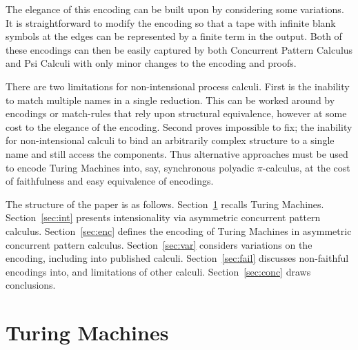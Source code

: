 \documentclass[submission,copyright,creativecommons]{eptcs}
\begin{document}
The elegance of this encoding can be built upon by considering some variations.
It is straightforward to modify the encoding so that a tape with infinite blank symbols
at the edges can be represented by a finite term in the output.
Both of these encodings can then be easily captured by both Concurrent Pattern Calculus
and Psi Calculi with only minor changes to the encoding and proofs.

There are two limitations for non-intensional process calculi.
First is the inability to match multiple names in a single reduction.
This can be worked around by encodings or match-rules that rely upon structural equivalence,
however at some cost to the elegance of the encoding.
Second proves impossible to fix; the inability for non-intensional calculi to bind
an arbitrarily complex structure to a single name and still access the components.
Thus alternative approaches must be used to encode Turing Machines into, say,
synchronous polyadic $\pi$-calculus, at the cost of faithfulness and easy equivalence
of encodings.


\medskip

The structure of the paper is as follows.
Section~\ref{sec:tm} recalls Turing Machines.
Section~\ref{sec:int} presents intensionality via asymmetric concurrent pattern calculus.
Section~\ref{sec:enc} defines the encoding of Turing Machines in asymmetric concurrent pattern calculus.
Section~\ref{sec:var} considers variations on the encoding, including into published calculi.
Section~\ref{sec:fail} discusses non-faithful encodings into, and limitations of other calculi.
Section~\ref{sec:conc} draws conclusions.

\section{Turing Machines}
\label{sec:tm}
\end{document}
